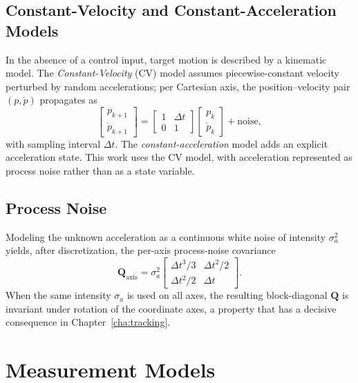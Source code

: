 \subsection{Constant-Velocity and Constant-Acceleration Models}

In the absence of a control input, target motion is described by a kinematic
model. The \emph{Constant-Velocity} (CV) model assumes piecewise-constant
velocity perturbed by random accelerations; per Cartesian axis, the
position--velocity pair $(p,\dot p)$ propagates as
\begin{equation}
  \begin{bmatrix} p_{k+1} \\ \dot p_{k+1} \end{bmatrix}
  = \begin{bmatrix} 1 & \Delta t \\ 0 & 1 \end{bmatrix}
    \begin{bmatrix} p_{k} \\ \dot p_{k} \end{bmatrix} + \text{noise},
  \label{eq:cv}
\end{equation}
with sampling interval $\Delta t$. The \emph{constant-acceleration} model adds an
explicit acceleration state. This work uses the CV model, with acceleration
represented as process noise rather than as a state variable.

\subsection{Process Noise}

Modeling the unknown acceleration as a continuous white noise of intensity
$\sigma_a^2$ yields, after discretization, the per-axis process-noise covariance
\begin{equation}
  \bm{Q}_{\text{axis}} = \sigma_a^{2}
  \begin{bmatrix} \Delta t^{3}/3 & \Delta t^{2}/2 \\[2pt] \Delta t^{2}/2 & \Delta t \end{bmatrix}.
  \label{eq:cwna}
\end{equation}
When the same intensity $\sigma_a$ is used on all axes, the resulting block-diagonal
$\bm{Q}$ is invariant under rotation of the coordinate axes, a property that has
a decisive consequence in Chapter~\ref{cha:tracking}.

\section{Measurement Models}

